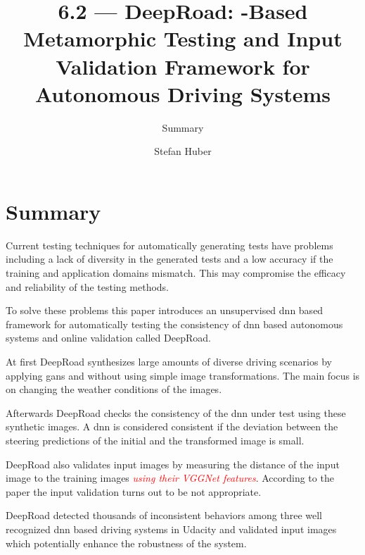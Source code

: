 \documentclass[oneside, notitlepage, twocolumn]{scrartcl}
\title{\LARGE 6.2 --- DeepRoad: \glstext{gan}-Based Metamorphic Testing and Input Validation Framework for Autonomous Driving Systems}
\subtitle{Summary}
\author{Stefan Huber}
\newcommand{\draft}[1]{\textcolor{red}{\textit{#1}}}
\begin{document}
\maketitle

\section{Summary}
Current testing techniques for automatically generating tests have problems including a lack of diversity in the generated tests and a low accuracy if the training and application domains mismatch.
This may compromise the efficacy and reliability of the testing methods.\par
To solve these problems this paper introduces an unsupervised \gls{dnn} based framework for automatically testing the consistency of \gls{dnn} based autonomous systems and online validation called DeepRoad.\par
At first DeepRoad synthesizes large amounts of diverse driving scenarios by applying \glspl{gan} and without using simple image transformations.
The main focus is on changing the weather conditions of the images.\par
Afterwards DeepRoad checks the consistency of the \gls{dnn} under test using these synthetic images.
A \gls{dnn} is considered consistent if the deviation between the steering predictions of the initial and the transformed image is small.\par
DeepRoad also validates input images by measuring the distance of the input image to the training images \draft{using their VGGNet features}.
According to the paper the input validation turns out to be not appropriate.\par
DeepRoad detected thousands of inconsistent behaviors among three well recognized \gls{dnn} based driving systems in Udacity and validated input images which potentially enhance the robustness of the system.
\end{document}

